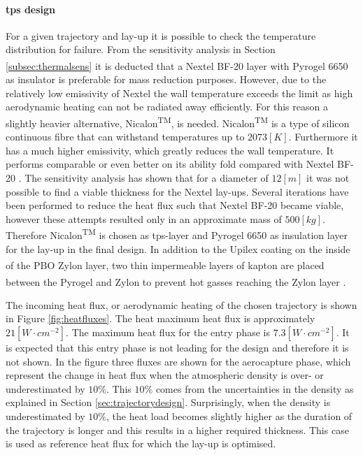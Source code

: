 \paragraph{\acrlong{tps} design}
For a given trajectory and lay-up it is possible to check the temperature distribution for failure. From the sensitivity analysis in Section \ref{subsec:thermalsens} it is deducted that a Nextel BF-20 layer with Pyrogel\textsuperscript{\textregistered} 6650 as insulator is preferable for mass reduction purposes. However, due to the relatively low emissivity of Nextel the wall temperature exceeds the limit as high aerodynamic heating can not be radiated away efficiently. For this reason a slightly heavier alternative, Nicalon\textsuperscript{TM}, is needed. Nicalon\textsuperscript{TM} is a type of silicon continuous fibre that can withstand temperatures up to $2073 \left[K\right]$. Furthermore it has a much higher emissivity, which greatly reduces the wall temperature. It performs comparable or even better on its ability fold compared with Nextel BF-20 \cite{Corso2011}. The sensitivity analysis has shown that for a diameter of $12 \left[m\right]$ it was not possible to find a viable thickness for the Nextel lay-ups. Several iterations have been performed to reduce the heat flux such that Nextel BF-20 became viable, however these attempts resulted only in an approximate mass of $500 \left[kg\right]$. Therefore Nicalon\textsuperscript{TM} is chosen as \gls{tps}-layer and Pyrogel\textsuperscript{\textregistered} 6650 as insulation layer for the lay-up in the final design. In addition to the Upilex coating on the inside of the PBO Zylon\textsuperscript{\textregistered} layer, two thin impermeable layers of kapton are placed between the Pyrogel\textsuperscript{\textregistered} and Zylon\textsuperscript{\textregistered} to prevent hot gasses reaching the Zylon\textsuperscript{\textregistered} layer \cite{Hughes2005,Litton2011}.

The incoming heat flux, or aerodynamic heating of the chosen trajectory is shown in Figure \ref{fig:heatfluxes}. The heat maximum heat flux is approximately $21 \left[W\cdot cm^{-2}\right]$. The maximum heat flux for the entry phase is $7.3 \left[W\cdot cm^{-2}\right]$. It is expected that this entry phase is not leading for the design and therefore it is not shown. In the figure three fluxes are shown for the aerocapture phase, which represent the change in heat flux when the atmospheric density is over- or underestimated by $10\%$. This $10\%$ comes from the uncertainties in the density as explained in Section \ref{sec:trajectorydesign}. Surprisingly, when the density is underestimated by $10\%$, the heat load becomes slightly higher as the duration of the trajectory is longer and this results in a higher required thickness. This case is used as reference heat flux for which the lay-up is optimised.

